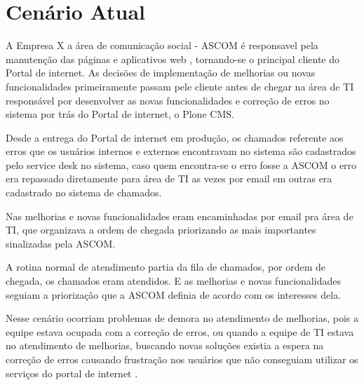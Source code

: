 \section{Cenário Atual}\label{aeb}

A Empresa X  a área de comunicação social - ASCOM é responsavel pela manutenção das páginas e aplicativos web , tornando-se o principal cliente do Portal de internet. As decisões de implementação de melhorias ou novas funcionalidades primeiramente passam pele cliente antes de chegar na área de TI responsável por desenvolver as novas  funcionalidades e correção de erros no sistema por trás do Portal de internet, o Plone CMS\cite{PloneCMS}.

Desde a entrega do Portal de internet em produção, os chamados referente aos erros que os usuários internos e externos encontravam no sistema são cadastrados pelo service desk no sistema, caso quem encontra-se o erro fosse a ASCOM o erro era repassado diretamente para área de TI as vezes por email em outras era cadastrado no sistema de chamados.

Nas melhorias e novas funcionalidades eram encaminhadas por email pra área de TI, que organizava a ordem de chegada priorizando as mais importantes sinalizadas pela ASCOM.

A rotina normal de atendimento partia da fila de chamados, por ordem de chegada, os chamados eram atendidos. E as melhorias e novas funcionalidades seguiam a priorização que a ASCOM definia de acordo com os interesses dela.

Nesse cenário ocorriam problemas de demora no atendimento de melhorias, pois a equipe estava ocupada com a correção de erros, ou quando a equipe de TI estava no atendimento de melhorias, buscando novas soluções existia a espera na correção de erros causando frustração nos usuários que não conseguiam utilizar os serviços do portal de internet .


